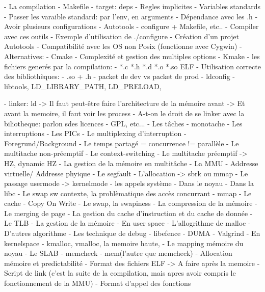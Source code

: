 \documentclass[10pt,ucs,usepdftitle=false]{beamer}
\begin{document}
  - La compilation
    - Makefile
      - target: deps
      - Regles implicites
      - Variables standards
      - Passer les varaible standard: par l'env, en arguments
      - Dépendance avec les .h
      - Avoir plusieurs configurations
    - Autotools
      - configure + Makefile, etc..
      - Compiler avec ces outils
      - Exemple d'utilisation de ./configure
      - Création d'un projet Autotools
    - Compatibilité avec les OS non Posix (fonctionne avec Cygwin)
      - Alternatives:
        - Cmake
    - Complexité et gestion des multiples options
      - Kmake
    - les fichiers generés par la compilation:
      - *.c *.h *.d *.o *.so ELF
    - Utilisation correcte des bibliothèques:
      - .so + .h
      - packet de dev vs packet de prod
    - ldconfig
    - libtools, LD_LIBRARY_PATH, LD_PRELOAD, 

    - linker: ld                             -> Il faut peut-être faire l'architecture de la mémoire avant -> Et avant la memoire, il faut voir les process
    - A-t-on le droit de se linker avec la biliotheque: parlon sdes licences
      - GPL, etc...
  - Les tâches
    - monotache
    - Les interruptions
      - Les PICs
      - Le multiplexing d'interruption
    - Foregrund/Background
    - Le temps partagé = concurrence != parallèle
    - Le multitache non-préemptif
      - Le context-switching
    - Le multitache préemptif -> HZ, dynamic HZ
    - La gestion de la mémoire en multitâche
      - La MMU
      - Addresse virtuelle/ Addresse phyique
      - Le segfault
      - L'allocation -> sbrk ou mmap
      - Le passage usermode -> kernelmode
      - les appels système
         - Dans le noyau
         - Dans la libc
         - Le swap sw contexte, la problèmatique des accès concurrant
      - mmap
      - Le cache
      - Copy On Write
      - Le swap, la swapiness
      - La compression de la mémoire
      - Le merging de page
      - La gestion du cache d'instruction et du cache de donnée
      - Le TLB
  - La gestion de la mémoire
     - En user space
       - L'allogrithme de malloc
       - D'autres algorithme
       - Les technique de debug
         - libefence
         - DUMA
         - Valgrind
     - En kernelspace
       - kmalloc, vmalloc, la memoire haute, 
       - Le mapping mémoire du noyau
       - Le SLAB
       - memcheck
       - mem(l'autre que memcheck)
     - Allocation mémoire et predictabilité
  - Format des fichiers ELF -> A faire après la memoire
    - Script de link (c'est la suite de la compilation, mais apres avoir compris le fonctionnement de la MMU)
    - Format d'appel des fonctions
\end{document}
